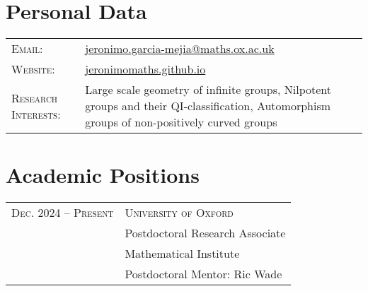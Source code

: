 \documentclass[a4paper,11pt]{article} %
\begin{document}
\pagestyle{empty} %


\par{\bigskip\par} %

\section{Personal Data}

\begin{longtable}{>{\raggedleft\arraybackslash}p{4cm}p{10cm}}
\textsc{Email:} & \href{mailto:jeronimo.garcia-mejia@maths.ox.ac.uk}{jeronimo.garcia-mejia@maths.ox.ac.uk}\\
\textsc{Website:} & \href{https://jeronimomaths.github.io}{jeronimomaths.github.io} \\
\textsc{Research Interests:} & Large scale geometry of infinite groups,  Nilpotent groups and their QI-classification, Automorphism groups of non-positively curved groups \end{longtable}

\section{Academic Positions}

\begin{longtable}{>{\raggedleft\arraybackslash}p{4cm}p{10cm}}
\textsc{Dec. 2024 -- Present} & \textsc{University of Oxford} \vspace{0.2em} \\
& Postdoctoral Research Associate \\
& Mathematical Institute \\
& \quad Postdoctoral Mentor: Ric Wade
\end{longtable}

\end{document}
